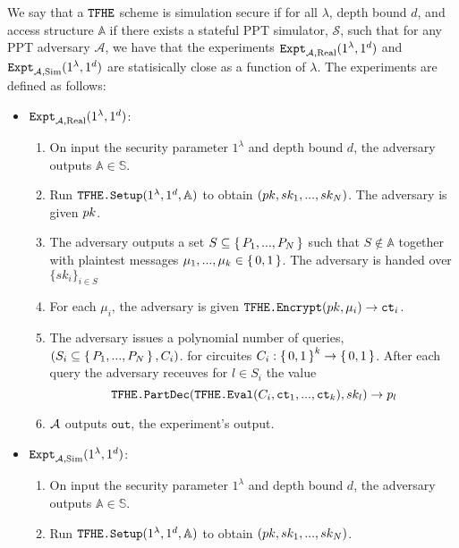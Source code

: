 \begin{definition}
	\label{def:simSecTFHE}
	We say that a ${\texttt{TFHE}}$ scheme is simulation secure if for all $\lambda$, depth bound $d$, and access structure $\mathbb{A}$
	if there exists a stateful PPT simulator, $\mathcal{S}$, such that for any PPT adversary $\mathcal{A}$,
	we have that the experiments $\texttt{Expt}_{\mathcal{A}, \text{Real}}(1^\lambda, 1^d)$ and $\texttt{Expt}_{\mathcal{A}, \text{Sim}}(1^\lambda, 1^d)$ are statisically close
	as a function of $\lambda$. The experiments are defined as follows:

	\begin{itemize}
		\item
		      $\texttt{Expt}_{\mathcal{A}, \text{Real}}(1^\lambda, 1^d)$: \begin{enumerate}
			      \item On input the security parameter $1^\lambda$ and depth bound $d$, the adversary outputs $\mathbb{A} \in \mathbb{S}$.
			      \item Run $\texttt{TFHE.Setup}(1^\lambda, 1^d, \mathbb{A})$ to obtain $(pk, sk_1, ..., sk_N)$.
						The adversary is given $pk$.
						\item The adversary outputs a set $S \subseteq \set{P_1, ..., P_N}$ such that $S \notin \mathbb{A}$
						together with plaintest messages $\mu_1, ..., \mu_k \in \set{0, 1}$. The adversary is handed over $\{sk_i\}_{i \in S}$
						\item For each $\mu_i$, the adversary is given $\texttt{TFHE.Encrypt}(pk, \mu_i) \rightarrow \texttt{ct}_i$.
						\item The adversary issues a polynomial number of queries, $(S_i \subseteq \set{P_1, ..., P_N}, C_i)$.
						for circuites $C_i: \set{0, 1}^k \rightarrow \set{0, 1}$. After each query the adversary receuves for $l \in S_i$ the value
						$$
						\texttt{TFHE.PartDec}(\texttt{TFHE.Eval}(C_i, \texttt{ct}_1, ..., \texttt{ct}_k), sk_l) \rightarrow p_l
						$$
						\item $\mathcal{A}$ outputs $\texttt{out}$, the experiment's output.
		      \end{enumerate}
		\item
		      $\texttt{Expt}_{\mathcal{A}, \text{Sim}}(1^\lambda, 1^d)$: \begin{enumerate}
			      \item On input the security parameter $1^\lambda$ and depth bound $d$, the adversary outputs $\mathbb{A} \in \mathbb{S}$.
			      \item Run $\texttt{TFHE.Setup}(1^\lambda, 1^d, \mathbb{A})$ to obtain $(pk, sk_1, ..., sk_N)$.

\end{enumerate}
\end{itemize}
\end{definition}
